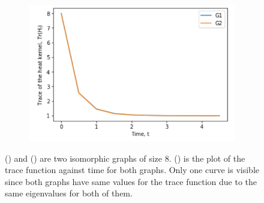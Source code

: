 \documentclass[10pt,a4paper]{article}
\begin{document}
\begin{figure}[H]
\begin{subfigure}[b]{0.30\textwidth}
        		\label{isotracegraph2}
        	\end{subfigure}~
        	\begin{subfigure}[b]{0.35\textwidth}
        		\includegraphics[width= \textwidth]{images/Trace-Isomorphics.png}
        		\caption{}
        		\label{isotracegraphplot}
        	\end{subfigure}
        	\caption{() and ()  are two isomorphic graphs of size $8$. () is the plot of the trace function against time for both graphs. Only one curve is visible since both graphs have same values for the trace function due to the same eigenvalues for both of them. }
        	\label{TraceIsomorphism}
        \end{figure}
        
\end{document}
